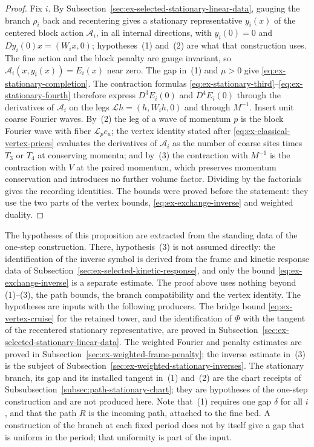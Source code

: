\begin{proof}
Fix $i$. By Subsection~\ref{sec:ex-selected-stationary-linear-data},
gauging the branch $\rho_i$ back and recentering gives a stationary
representative $y_i(x)$ of the centered block action $\mathcal A_i$,
in all internal directions, with $y_i(0)=0$ and $Dy_i(0)x=(W_ix,0)$;
hypotheses~(1) and~(2) are what that construction uses. The fine
action and the block penalty are gauge invariant, so
$\mathcal A_i(x,y_i(x))=E_i(x)$ near zero. The gap in~(1) and $\mu>0$ give
\eqref{eq:ex-stationary-completion}. The contraction formulas
\eqref{eq:ex-stationary-third}--\eqref{eq:ex-stationary-fourth}
therefore express $D^3E_i(0)$ and $D^4E_i(0)$ through the derivatives
of $\mathcal A_i$ on the legs $\mathcal Lh=(h,W_ih,0)$ and through
$M^{-1}$. Insert unit coarse Fourier waves. By~(2) the leg of a wave of
momentum $p$ is the block Fourier wave with fiber
$\mathcal L_pe_a$; the vertex identity stated after
\eqref{eq:ex-classical-vertex-prices} evaluates the derivatives of
$\mathcal A_i$ as the number of coarse sites times $T_3$ or $T_4$ at
conserving momenta; and by~(3) the contraction with $M^{-1}$ is the
contraction with $V$ at the paired momentum, which preserves momentum
conservation and introduces no further volume factor. Dividing by the
factorials gives the recording identities. The bounds were proved
before the statement: they use the two parts of the vertex bounds,
\eqref{eq:ex-exchange-inverse} and weighted duality.
\end{proof}

The hypotheses of this proposition are extracted from the standing
data of the one-step construction. There, hypothesis~(3) is not assumed
directly: the identification of the inverse symbol is derived from the
frame and kinetic response data of
Subsection~\ref{sec:ex-selected-kinetic-response}, and only the bound
\eqref{eq:ex-exchange-inverse} is a separate estimate. The proof above
uses nothing beyond (1)--(3), the path bounds, the branch compatibility
and the vertex identity. The hypotheses are inputs with the following
producers. The bridge bound \eqref{eq:ex-vertex-cruise} for the
retained tower, and the identification of $\Phi$ with the tangent of
the recentered stationary representative, are proved in
Subsection~\ref{sec:ex-selected-stationary-linear-data}. The weighted
Fourier and penalty estimates are proved in
Subsection~\ref{sec:ex-weighted-frame-penalty}; the inverse estimate
in~(3) is the subject of
Subsection~\ref{sec:ex-weighted-stationary-inverses}. The stationary
branch, its gap and its installed tangent in~(1) and~(2) are the chart
receipts of Subsubsection~\ref{subsec:path-stationary-chart}; they are
hypotheses of the one-step construction and are not produced here.
Note that~(1) requires one gap $\delta$ for all $i$, and that the path
$R$ is the incoming path, attached to the fine bed. A construction of
the branch at each fixed period does not by itself give a gap that is
uniform in the period; that uniformity is part of the input.

